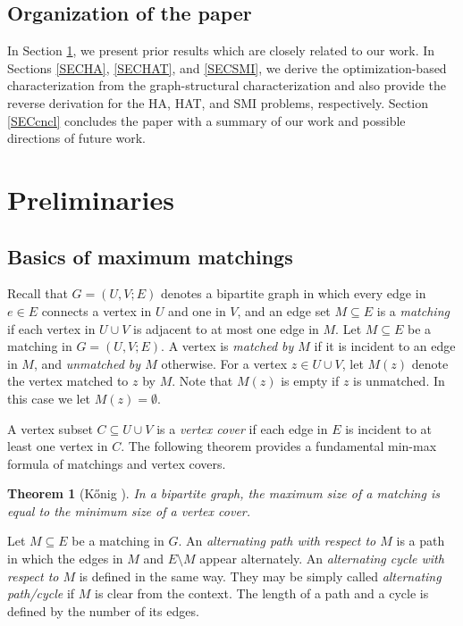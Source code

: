 \documentclass[11pt,a4paper,showkeys]{article}
\theoremstyle{plain}
\newtheorem{theorem}{Theorem}[section]
\theoremstyle{definition}
\begin{document}
\subsection{Organization of the paper}

In Section \ref{SECpre}, 
we present prior results which are closely related to our work. 
In Sections \ref{SECHA}, \ref{SECHAT}, 
and \ref{SECSMI}, 
we derive the optimization-based characterization from the graph-structural characterization 
and also provide the reverse derivation 
for the HA, HAT, and SMI problems, 
respectively. 
Section \ref{SECcncl} concludes the paper with a summary of our work and possible directions of future work. 

\section{Preliminaries}
\label{SECpre}

\subsection{Basics of maximum matchings}

\label{SECbasics}

Recall that 
$G=(U,V;E)$ denotes a bipartite graph in which every edge in $e\in E$ connects a vertex in $U$ and one in $V$, 
and 
an edge set $M\subseteq E$ is a \emph{matching} if each vertex in $U\cup V$ is adjacent to 
at most one edge in $M$. 
Let $M\subseteq E$ be a matching in $G=(U,V;E)$. 
A vertex is \emph{matched by $M$} if it is incident to an edge in $M$, 
and \emph{unmatched by $M$} otherwise. 
For a vertex $z\in U\cup V$, 
let $M(z)$ denote the vertex matched to $z$ by $M$. 
Note that $M(z)$ is empty if $z$ is unmatched. 
In this case we let $M(z)=\emptyset$. 

A vertex subset $C \subseteq U \cup V$ is a \emph{vertex cover} if 
each edge in $E$ is incident to at least one vertex in $C$. 
The following theorem provides a fundamental min-max formula of matchings and vertex covers. 
\begin{theorem}[K\H{o}nig \cite{Kon31}]
\label{THMkonig}
    In a bipartite graph, 
    the maximum size of a matching is equal to the minimum size of a vertex cover. 
\end{theorem}


Let $M \subseteq E$ be a matching in $G$. 
An \emph{alternating path with respect to $M$} is a path in which the edges in $M$ and $E \setminus M$ appear alternately. 
An \emph{alternating cycle with respect to $M$} is defined in the same way. 
They may be simply called \emph{alternating path/cycle} if $M$ is clear from the context. 
The length of a path and a cycle is defined by the number of its edges. 
\end{document}
